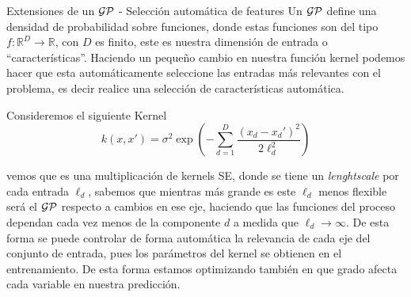 \documentclass[9pt]{beamer}
\begin{document}
\begin{frame}{Extensiones de un $\mathcal{GP}$ - Selección automática de features}
    Un $\mathcal{GP}$ define una densidad de probabilidad sobre funciones, donde estas funciones son del tipo $f: \mathbb{R}^D \rightarrow \mathbb{R}$, con $D$ es finito, este es nuestra dimensión de entrada o ``características''. Haciendo un pequeño cambio en nuestra función kernel podemos hacer que esta automáticamente seleccione las entradas más relevantes con el problema, es decir realice una selección de características automática.
    \vspace{0.2cm} \pause

    Consideremos el siguiente Kernel 
        \begin{equation*}
        k(x, x') = \sigma^2 \exp\left( -\sum_{d=1}^{D} \frac{(x_d - x_d')^2}{2\ell_d^2}\right)
        \end{equation*} \pause 
    
    
    vemos que es una multiplicación de kernels SE, donde se tiene un \textit{lenghtscale} por cada entrada $\ell_d$, sabemos que mientras más grande es este $\ell_d$ menos flexible será el $\mathcal{GP}$ respecto a cambios en ese eje, haciendo que las funciones del proceso dependan cada vez menos de la componente $d$ a medida que $\ell_d \rightarrow \infty$. De esta forma se puede controlar de forma automática la relevancia de cada eje del conjunto de entrada, pues los parámetros del kernel se obtienen en el entrenamiento. De esta forma estamos optimizando también en que grado afecta cada variable en nuestra predicción.

\end{frame}
\end{document}
